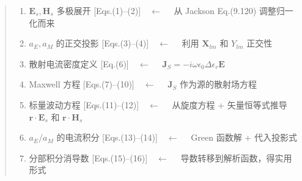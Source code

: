 \begin{quote}\small
\begin{enumerate}
  \item $\mathbf{E}_s,\mathbf{H}_s$ 多极展开 [Eqs.(1)--(2)]$\quad\longleftarrow\quad$ 从 Jackson Eq.(9.120) 调整归一化而来
  \item $a_E,a_M$ 的正交投影 [Eqs.(3)--(4)]$\quad\longleftarrow\quad$ 利用 $\mathbf{X}_{lm}$ 和 $Y_{lm}$ 正交性
  \item 散射电流密度定义 [Eq.(6)]$\quad\longleftarrow\quad$ $\mathbf{J}_S = -i\omega\epsilon_0\Delta\epsilon_r\mathbf{E}$
  \item Maxwell 方程 [Eqs.(7)--(10)]$\quad\longleftarrow\quad$ $\mathbf{J}_S$ 作为源的散射场方程
  \item 标量波动方程 [Eqs.(11)--(12)]$\quad\longleftarrow\quad$ 从旋度方程 + 矢量恒等式推导 $\mathbf{r}\cdot\mathbf{E}_s$ 和 $\mathbf{r}\cdot\mathbf{H}_s$
  \item $a_E/a_M$ 的电流积分 [Eqs.(13)--(14)]$\quad\longleftarrow\quad$ Green 函数解 + 代入投影式
  \item 分部积分消导数 [Eqs.(15)--(16)]$\quad\longleftarrow\quad$ 导数转移到解析函数，得实用形式
\end{enumerate}
\end{quote}


